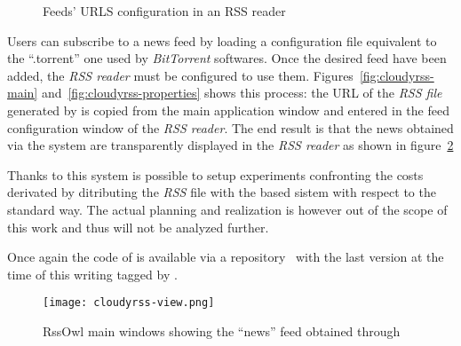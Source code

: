 \begin{figure}[h!]
  \centering
  \caption{Feeds' URLS configuration in an RSS reader}
  \label{fig:cloudyrss-feeds}
\end{figure}

\clearpage
Users can subscribe to a news feed by loading a
configuration file equivalent to the ``.torrent'' one used by
\textit{BitTorrent} softwares. Once the desired feed have been
added, the \textit{RSS reader} must be configured to use them.
Figures~\ref{fig:cloudyrss-main} and~\ref{fig:cloudyrss-properties}
shows this process: the URL of the \textit{RSS file} generated by
\cloudypeer is copied from the main application window and entered in
the feed configuration window of the \textit{RSS reader}.
The end result is that the news obtained via the \cloudcast system are
transparently displayed in the \textit{RSS reader} as shown in figure~\ref{fig:cloudyrss-view}

Thanks to this system is possible to setup experiments confronting the
costs derivated by ditributing the \textit{RSS} file with the
\cloudcast based sistem with respect to the standard way. The actual
planning and realization is however out of the scope of this work and
thus will not be analyzed further.

Once again the code of \cloudyrss is available via a \github
repository~\cite{cloudyrss-repo} with the last version at the time of
this writing tagged by \thesistag.

\begin{figure}[h!]
  \hspace{-40pt}
  \texttt{[image: cloudyrss-view.png]}
  \caption{RssOwl main windows showing the ``news'' feed obtained
    through \cloudyrss}
  \label{fig:cloudyrss-view}
\end{figure}
